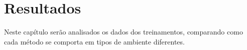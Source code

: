 \chapter{Resultados}
\label{chap:analiseresultados}

 Neste capítulo serão analisados os dados dos treinamentos, comparando como cada método se comporta em tipos de ambiente diferentes.